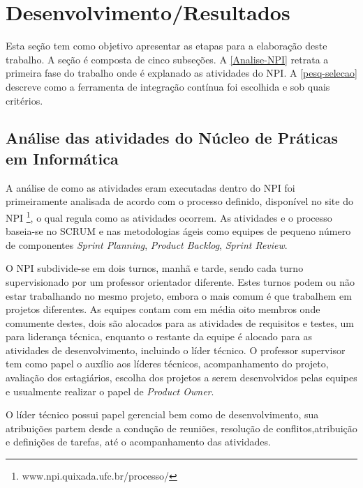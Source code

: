 \chapter{Desenvolvimento/Resultados}
Esta seção tem como objetivo apresentar as etapas para a elaboração deste trabalho. A seção é composta de cinco subseções. A \autoref{Analise-NPI} retrata a primeira fase do trabalho onde é explanado as atividades do NPI. A \autoref{pesq-selecao} descreve como a ferramenta de integração contínua foi escolhida e sob quais critérios.


\section{Análise das atividades do Núcleo de Práticas em Informática}\label{Analise-NPI}
A análise de como as atividades eram executadas dentro do NPI foi primeiramente analisada de acordo com o processo definido, disponível no site do NPI \footnote{www.npi.quixada.ufc.br/processo/}, o qual regula como as atividades ocorrem. As atividades e o processo baseia-se no SCRUM e nas metodologias ágeis como equipes de pequeno número de componentes \textit{Sprint Planning}, \textit{Product Backlog}, \textit{Sprint Review}.

O NPI subdivide-se em dois turnos, manhã e tarde, sendo cada turno supervisionado por um professor orientador diferente. Estes turnos podem ou não estar trabalhando no mesmo projeto, embora o mais comum é que trabalhem em projetos diferentes. As equipes contam com em média oito membros onde comumente destes, dois são alocados para as atividades de requisitos e testes, um para liderança técnica, enquanto o restante da equipe é alocado para as atividades de desenvolvimento, incluindo o líder técnico. O professor supervisor tem como papel o auxílio aos líderes técnicos, acompanhamento do projeto, avaliação dos estagiários, escolha dos projetos a serem desenvolvidos pelas equipes e usualmente realizar o papel de \textit{Product Owner}. 

O líder técnico possui papel gerencial bem como de desenvolvimento, sua atribuições partem desde a condução de reuniões, resolução de conflitos,atribuição e definições de tarefas, até o acompanhamento das atividades. 

